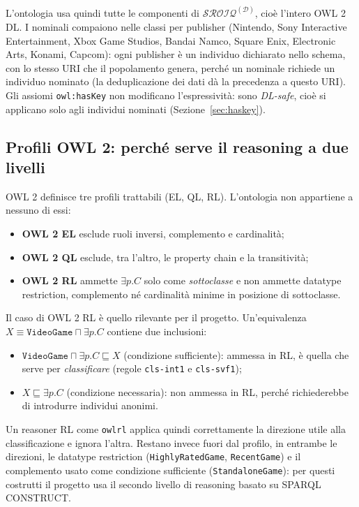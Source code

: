L'ontologia usa quindi tutte le componenti di $\mathcal{SROIQ}^{(\mathcal{D})}$, cio\`e
l'intero OWL 2 DL. I nominali compaiono nelle classi per publisher (Nintendo, Sony Interactive Entertainment, Xbox Game Studios,
Bandai Namco, Square Enix, Electronic Arts, Konami, Capcom): ogni publisher \`e un individuo dichiarato
nello schema, con lo stesso URI che il popolamento genera, perch\'e un nominale richiede un individuo nominato
(la deduplicazione dei dati d\`a la precedenza a questo URI).
Gli assiomi \texttt{owl:hasKey} non modificano l'espressivit\`a: sono \emph{DL-safe},
cio\`e si applicano solo agli individui nominati (Sezione~\ref{sec:haskey}).

\subsection{Profili OWL 2: perch\'e serve il reasoning a due livelli}

OWL 2 definisce tre profili trattabili (EL, QL, RL). L'ontologia non appartiene a
nessuno di essi:
\begin{itemize}[nosep]
  \item \textbf{OWL 2 EL} esclude ruoli inversi, complemento e cardinalit\`a;
  \item \textbf{OWL 2 QL} esclude, tra l'altro, le property chain e la transitivit\`a;
  \item \textbf{OWL 2 RL} ammette $\exists p.C$ solo come \emph{sottoclasse} e non ammette
    datatype restriction, complemento n\'e cardinalit\`a minime in posizione di sottoclasse.
\end{itemize}

Il caso di OWL 2 RL \`e quello rilevante per il progetto. Un'equivalenza
$X \equiv \texttt{VideoGame} \sqcap \exists p.C$ contiene due inclusioni:
\begin{itemize}[nosep]
  \item $\texttt{VideoGame} \sqcap \exists p.C \sqsubseteq X$ (condizione sufficiente):
    ammessa in RL, \`e quella che serve per \emph{classificare} (regole
    \texttt{cls-int1} e \texttt{cls-svf1});
  \item $X \sqsubseteq \exists p.C$ (condizione necessaria): non ammessa in RL, perch\'e
    richiederebbe di introdurre individui anonimi.
\end{itemize}
Un reasoner RL come \texttt{owlrl} applica quindi correttamente la direzione utile
alla classificazione e ignora l'altra. Restano invece fuori dal profilo, in entrambe
le direzioni, le datatype restriction (\texttt{HighlyRatedGame}, \texttt{RecentGame})
e il complemento usato come condizione sufficiente (\texttt{StandaloneGame}): per
questi costrutti il progetto usa il secondo livello di reasoning basato su SPARQL
CONSTRUCT.

